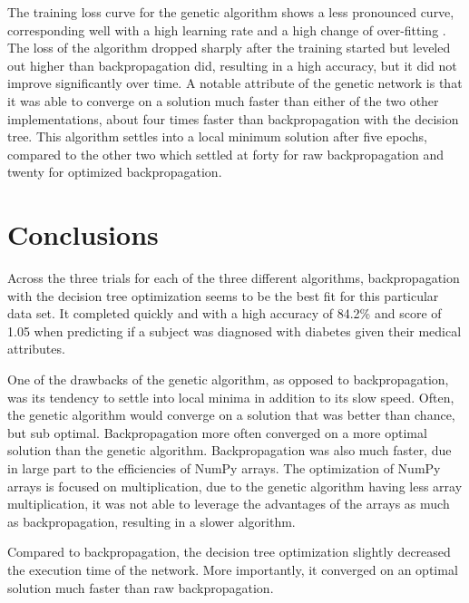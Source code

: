 \documentclass[12pt]{article}
\begin{document}
        \pagebreak

        The training loss curve for the genetic algorithm shows a less pronounced curve, corresponding well with a high
        learning rate and a high change of over-fitting \cite{goodLoss}.  The loss of the algorithm dropped sharply after the 
        training started but leveled out higher than backpropagation did, resulting in a high accuracy, but it did not improve significantly over time.
        A notable attribute of the genetic network is that it was able to converge on a solution much faster than either of the two other implementations,
        about four times faster than backpropagation with the decision tree.
        This algorithm settles into a local minimum solution after five epochs, compared to the other two which settled at forty for raw backpropagation and
        twenty for optimized backpropagation.
\section{Conclusions}
    Across the three trials for each of the three different algorithms, backpropagation with the decision tree optimization
    seems to be the best fit for this particular data set.  It completed quickly and with a high accuracy of 84.2\% 
    and score of 1.05 when predicting if a subject was diagnosed with diabetes given their medical attributes.  

    One of the drawbacks of the genetic algorithm, as opposed to
    backpropagation, was its tendency to settle into local minima in addition to its slow speed.  Often, the genetic algorithm would converge
    on a solution that was better than chance, but sub optimal.  Backpropagation more often converged on a more optimal solution
    than the genetic algorithm.  Backpropagation was also much faster, due in large part to the efficiencies of NumPy
    arrays.  The optimization of NumPy arrays is focused on multiplication, due to the genetic algorithm having less array multiplication,
    it was not able to leverage the advantages of the arrays as much as backpropagation, resulting in a slower algorithm.

    Compared to backpropagation, the decision tree optimization slightly decreased the execution time of the network.  More importantly, 
    it converged on an optimal solution much faster than raw backpropagation.
\pagebreak


\end{document}
